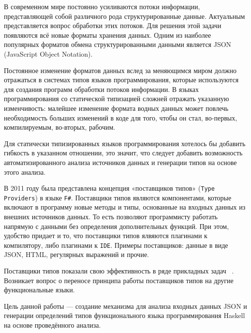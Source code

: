 


\graphicspath{ {img/} }




\Intro
В современном мире постоянно усиливаются потоки информации, представляющей собой различного рода структурированные данные. Актуальным представляется вопрос обработки этих потоков. Для решения этой задачи появляются всё новые форматы хранения данных. Одним из наиболее популярных форматов обмена структурированными данными является JSON (JavaScript Object Notation).

Постоянное изменение форматов данных вслед за меняющимся миром должно отражаться в системах типов языков программирования, которые используются для создания программ обработки потоков информации. В языках программирования со статической типизацией сложней отражать указанную изменчивость: малейшее изменение формата водных данных может повлечь необходимость больших изменений в коде для того, чтобы он стал, во-первых, компилируемым, во-вторых, рабочим.

Для статически типизированных языков программирования хотелось бы добавить гибкость в указанном отношении, это значит, что следует добавить возможность автоматизированного анализа источников данных и генерации типов на основе этого анализа. 

В 2011 году была представлена концепция «поставщиков типов» (\lstinline{Type Providers}) в языке \lstinline{F#}. Поставщики типов являются компонентами, которые включают в программу новые методы и типы, основанные на входных данных из внешних источников данных. То есть позволяют программисту работать напрямую с данными без определения дополнительных функций. При этом, удобство придает и то, что поставщики типов ялвяются плагинами к компилятору, либо плагинами к \lstinline{IDE}. Примеры поставщиков: данные в виде JSON, HTML, регулярных выражений и прочие.

Поставщики типов показали свою эффективность в ряде прикладных задач ~\cite{typo}. Возникает вопрос о переносе принципа работы поставщиков типов на другие функциональные языки.

Цель данной работы --- создание механизма для анализа входных данных JSON и генерации определений типов функционального языка программирования Haskell на основе проведённого анализа.


